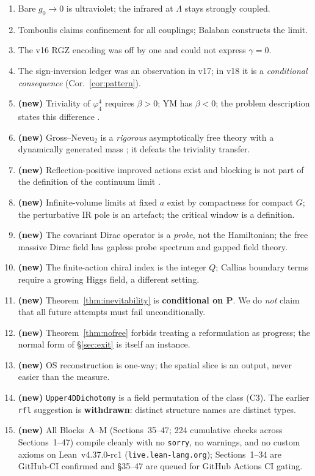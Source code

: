 \documentclass[11pt,a4paper]{article}
\theoremstyle{plain}
\theoremstyle{definition}
\theoremstyle{remark}
\renewcommand{\_}{\oldunderscore\allowbreak}
\newcommand{\Lean}[1]{\texttt{\small #1}}
\begin{document}
\begin{enumerate}[label=\textbf{I\arabic*.},leftmargin=30pt,itemsep=1pt]
\item Bare $g_0\to0$ is ultraviolet; the infrared at $\Lambda$ stays strongly coupled.
\item Tomboulis claims confinement for all couplings; Balaban constructs the limit.
\item The v16 RGZ encoding was off by one and could not express $\gamma=0$.
\item The sign-inversion ledger was an observation in v17; in v18 it is a
\emph{conditional consequence} (Cor.~\ref{cor:pattern}).
\item \textbf{(new)} Triviality of $\varphi^4_4$ requires $\beta>0$; YM has $\beta<0$; the
problem description states this difference \cite{JaffeWitten2000}.
\item \textbf{(new)} Gross--Neveu$_2$ is a \emph{rigorous} asymptotically free theory with a
dynamically generated mass \cite{FMRS1986,GK1985}; it defeats the triviality transfer.
\item \textbf{(new)} Reflection-positive improved actions exist and blocking is not part of the
definition of the continuum limit \cite{LuscherWeisz1985,Symanzik1985}.
\item \textbf{(new)} Infinite-volume limits at fixed $a$ exist by compactness for compact $G$;
the perturbative IR pole is an artefact; the critical window is a definition.
\item \textbf{(new)} The covariant Dirac operator is a \emph{probe}, not the Hamiltonian; the
free massive Dirac field has gapless probe spectrum and gapped field theory.
\item \textbf{(new)} The finite-action chiral index is the integer $Q$; Callias boundary terms
require a growing Higgs field, a different setting.
\item \textbf{(new)} Theorem~\ref{thm:inevitability} is \textbf{conditional on \textbf{P}}. We do
\emph{not} claim that all future attempts must fail unconditionally.
\item \textbf{(new)} Theorem~\ref{thm:nofree} forbids treating a reformulation as progress; the
normal form of \S\ref{sec:exit} is itself an instance.
\item \textbf{(new)} OS reconstruction is one-way; the spatial slice is an output, never easier
than the measure.
\item \textbf{(new)} \Lean{Upper4DDichotomy} is a field permutation of the class (C3). The
earlier \texttt{rfl} suggestion is \textbf{withdrawn}: distinct structure names are distinct
types.
\item \textbf{(new)} All Blocks~A--M (Sections~35--47; 224 cumulative checks across Sections~1--47) compile cleanly with no \texttt{sorry}, no warnings, and no custom axioms on Lean~v4.37.0-rc1 (\texttt{live.lean-lang.org}); Sections~1--34 are GitHub-CI confirmed and \S35--47 are queued for GitHub Actions CI gating.

\end{enumerate}
\end{document}
